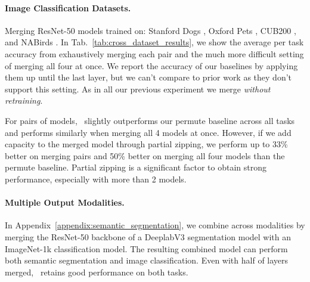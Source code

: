 \paragraph{Image Classification Datasets.}
Merging ResNet-50 models trained on: Stanford Dogs \cite{khosla2011stanforddogs}, Oxford Pets \cite{parkhi2012oxfordpets}, CUB200 \cite{welinder2010cub200}, and NABirds \cite{van2015buildingNaBird}. In Tab.~\ref{tab:cross_dataset_results},
we show the average per task accuracy from exhaustively merging each pair and the much more difficult setting of merging all four at once.
We report the accuracy of our baselines by applying them up until the last layer, but we can't compare to prior work as they don't support this setting. As in all our previous experiment we merge \textit{without retraining}.

For pairs of models, \name{}\ slightly outperforms our permute baseline across all tasks and performs similarly when merging all 4 models at once.
However, if we add capacity to the merged model through partial zipping, we perform up to 33\% better on merging pairs and 50\% better on merging all four models than the permute baseline. Partial zipping is a significant factor to obtain strong performance, especially with more than 2 models.

\paragraph{Multiple Output Modalities.} In Appendix~\ref{appendix:semantic_segmentation}, we combine across modalities by merging the ResNet-50 backbone of a DeeplabV3 \cite{chen2017deeplabv3} segmentation model with an ImageNet-1k classification model. The resulting combined model can perform both semantic segmentation and image classification. Even with half of layers merged, \name{}\ retains good performance on both tasks.
